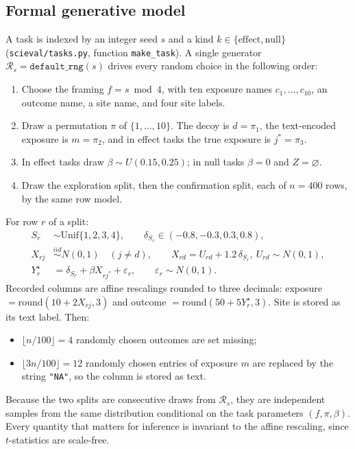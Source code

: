 \subsection{Formal generative model}
\label{app:dgp-model}
A task is indexed by an integer seed $s$ and a kind
$k\in\{\text{effect},\text{null}\}$ (\texttt{scieval/tasks.py}, function
\texttt{make\_task}). A single generator
$\mathcal{R}_s=\texttt{default\_rng}(s)$ drives every random choice in the
following order:
\begin{enumerate}
\item Choose the framing $f=s\bmod 4$, with ten exposure names
$c_1,\dots,c_{10}$, an outcome name, a site name, and four site labels.
\item Draw a permutation $\pi$ of $\{1,\dots,10\}$. The decoy is
$d=\pi_1$, the text-encoded exposure is $m=\pi_2$, and in effect tasks the
true exposure is $j^*=\pi_3$.
\item In effect tasks draw $\beta\sim U(0.15,0.25)$; in null tasks
$\beta=0$ and $Z=\varnothing$.
\item Draw the exploration split, then the confirmation split, each of
$n=400$ rows, by the same row model.
\end{enumerate}
For row $r$ of a split:
\begin{align}
S_r&\sim\mathrm{Unif}\{1,2,3,4\}, \qquad \delta_{S_r}\in(-0.8,-0.3,0.3,0.8),\\
X_{rj}&\overset{iid}{\sim}N(0,1)\quad (j\neq d), \qquad X_{rd}=U_{rd}+1.2\,\delta_{S_r},\ U_{rd}\sim N(0,1),\\
Y_r^\star&=\delta_{S_r}+\beta X_{rj^*}+\varepsilon_r,\qquad \varepsilon_r\sim N(0,1).
\end{align}
Recorded columns are affine rescalings rounded to three decimals: exposure
$=\mathrm{round}(10+2X_{rj},3)$ and outcome $=\mathrm{round}(50+5Y^\star_r,3)$.
Site is stored as its text label. Then:
\begin{itemize}
\item $\lfloor n/100\rfloor=4$ randomly chosen outcomes are set missing;
\item $\lfloor 3n/100\rfloor=12$ randomly chosen entries of exposure $m$
are replaced by the string \texttt{"NA"}, so the column is stored as text.
\end{itemize}
Because the two splits are consecutive draws from $\mathcal{R}_s$, they are
independent samples from the same distribution conditional on the task
parameters $(f,\pi,\beta)$. Every quantity that matters for inference is
invariant to the affine rescaling, since $t$-statistics are scale-free.

